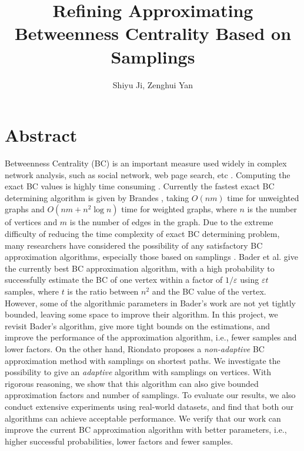 \documentclass[10pt]{article}
\begin{document}
\title{Refining Approximating Betweenness Centrality Based on Samplings}
\author{Shiyu Ji, Zenghui Yan}
\date{}
\maketitle

\newtheorem{definition}{Definition}
\newtheorem{theorem}{Theorem}
\newtheorem{lemma}{Lemma}
\newtheorem{corollary}{Corollary}

\newcommand{\p}{\mathrm{Pr}}

\section{Abstract}
Betweenness Centrality (BC) is an important measure used widely in complex network analysis, such as social network, web page search, etc \cite{barthelemy2004betweenness}. Computing the exact BC values is highly time consuming \cite{brandes2001faster, brandes2008variants}. Currently the fastest exact BC determining algorithm is given by Brandes \cite{brandes2001faster}, taking $O(nm)$ time for unweighted graphs and $O(nm+n^2\log n)$ time for weighted graphs, where $n$ is the number of vertices and $m$ is the number of edges in the graph. Due to the extreme difficulty of reducing the time complexity of exact BC determining problem, many researchers have considered the possibility of any satisfactory BC approximation algorithms, especially those based on samplings \cite{bader2007approximating, geisberger2008better}. Bader et al. \cite{bader2007approximating} give the currently best BC approximation algorithm, with a high probability to successfully estimate the BC of one vertex within a factor of $1/\varepsilon$ using $\varepsilon t$ samples, where $t$ is the ratio between $n^2$ and the BC value of the vertex. However, some of the algorithmic parameters in Bader's work are not yet tightly bounded, leaving some space to improve their algorithm. In this project, we revisit Bader's algorithm, give more tight bounds on the estimations, and improve the performance of the approximation algorithm, i.e., fewer samples and lower factors. On the other hand, Riondato \cite{riondato2014fast} proposes a \emph{non-adaptive} BC approximation method with samplings on shortest paths. We investigate the possibility to give an \emph{adaptive} algorithm with samplings on vertices. With rigorous reasoning, we show that this algorithm can also give bounded approximation factors and number of samplings. To evaluate our results, we also conduct extensive experiments using real-world datasets, and find that both our algorithms can achieve acceptable performance. We verify that our work can improve the current BC approximation algorithm with better parameters, i.e., higher successful probabilities, lower factors and fewer samples.
\end{document}

